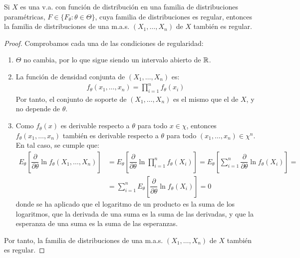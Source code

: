 \begin{teo}
    Si $X$ es una v.a. con función de distribución en una familia de distribuciones paramétricas, $F \in \{F_\theta : \theta \in \Theta\}$, cuya familia de distribuciones es regular, entonces la familia de distribuciones de una m.a.s. $(X_1, \ldots, X_n)$ de $X$ también es regular.
    \begin{proof}
        Comprobamos cada una de las condiciones de regularidad:
        \begin{enumerate}
            \item $\Theta$ no cambia, por lo que sigue siendo un intervalo abierto de $\mathbb{R}$.
            \item La función de densidad conjunta de $(X_1, \ldots, X_n)$ es:
            \begin{align*}
                f_\theta(x_1, \ldots, x_n) = \prod_{i=1}^{n} f_\theta(x_i)
            \end{align*}
            Por tanto, el conjunto de soporte de $(X_1, \ldots, X_n)$ es el mismo que el de $X$, y no depende de $\theta$.
            \item Como $f_\theta(x)$ es derivable respecto a $\theta$ para todo $x \in \chi$, entonces $f_\theta(x_1, \ldots, x_n)$ también es derivable respecto a $\theta$ para todo $(x_1, \ldots, x_n) \in \chi^n$. En tal caso, se cumple que:
            \begin{align*}
                E_\theta\left[\dfrac{\partial}{\partial\theta} \ln f_\theta(X_1, \ldots, X_n)\right]
                &= E_\theta\left[\dfrac{\partial}{\partial\theta} \ln \prod_{i=1}^{n} f_\theta(X_i)\right]
                = E_\theta\left[\sum_{i=1}^{n} \dfrac{\partial}{\partial\theta} \ln f_\theta(X_i)\right]
                =\\&= \sum_{i=1}^{n} E_\theta\left[\dfrac{\partial}{\partial\theta} \ln f_\theta(X_i)\right] = 0
            \end{align*}
            donde se ha aplicado que el logaritmo de un producto es la suma de los logaritmos, que la derivada de una suma es la suma de las derivadas, y que la esperanza de una suma es la suma de las esperanzas.
        \end{enumerate}

        Por tanto, la familia de distribuciones de una m.a.s. $(X_1, \ldots, X_n)$ de $X$ también es regular.
    \end{proof}
\end{teo}

